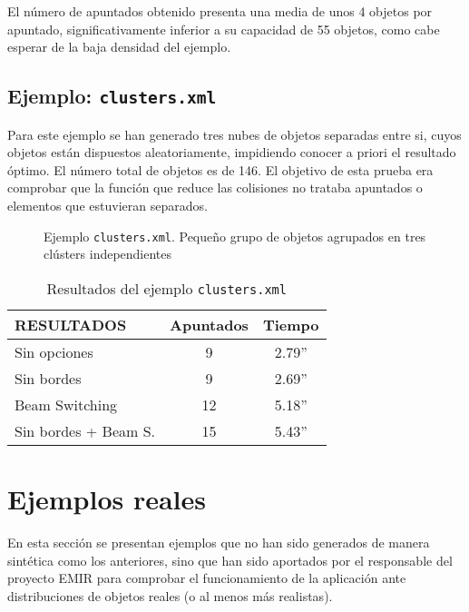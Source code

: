 El número de apuntados obtenido presenta una media de unos 4 objetos por
apuntado, significativamente inferior a su capacidad de 55 objetos, como cabe esperar 
de la baja densidad del ejemplo.

\subsection {Ejemplo: \texttt{clusters.xml}}
Para este ejemplo se han generado tres nubes de objetos separadas entre
si, cuyos objetos están dispuestos aleatoriamente, impidiendo conocer a priori
el resultado óptimo. El número total de objetos es de 146.
El objetivo de esta prueba era comprobar que la función
que reduce las colisiones no trataba apuntados o elementos que estuvieran
separados.
\begin{figure}[!htb]
\centering
{}
\caption{Ejemplo \texttt{clusters.xml}. Pequeño grupo de objetos agrupados en tres clústers independientes}
\end{figure}

\begin{table*}[!ht]
\centering
\begin{tabular}{||l||c|c||}
\hline
\hline
RESULTADOS & Apuntados & Tiempo \\
\hline
\hline
Sin opciones & 9 & 2.79'' \\
\hline
Sin bordes &9 & 2.69'' \\
\hline
Beam Switching & 12 & 5.18'' \\
\hline
Sin bordes + Beam S. & 15& 5.43'' \\
\hline
\hline
\end{tabular}
\caption{Resultados del ejemplo \texttt{clusters.xml}}
\end{table*}

\section{Ejemplos reales}
En esta sección se presentan ejemplos que no han sido generados de manera
sintética como los anteriores, sino que han sido aportados por el responsable del
proyecto EMIR para comprobar el funcionamiento de la aplicación ante distribuciones de
objetos reales (o al menos más realistas).

